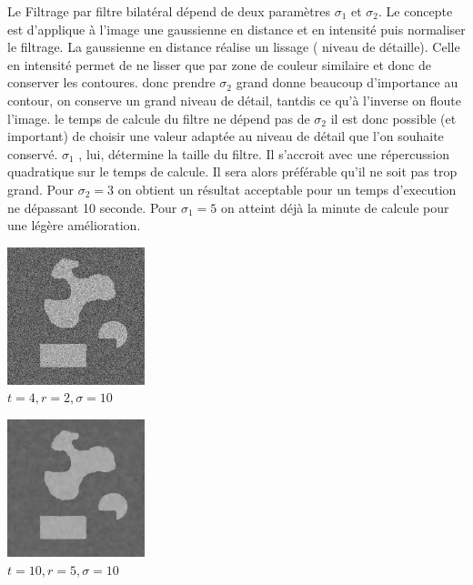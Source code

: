 \documentclass[a4,12pt]{article}
\begin{document}
Le Filtrage par filtre bilatéral dépend de deux paramètres $\sigma_1$ et $\sigma_2$. 
Le concepte est d'applique à l'image une gaussienne en distance et en intensité puis normaliser le filtrage.
La gaussienne en distance réalise un lissage ( niveau de détaille). 
Celle en intensité permet de ne lisser que par zone de couleur similaire et donc de conserver les contoures.
donc prendre $\sigma_2$ grand donne beaucoup d'importance au contour, 
on conserve un grand niveau de détail, 
tantdis ce qu'à l'inverse on floute l'image.
le temps de calcule du filtre ne dépend pas de $\sigma_2$ 
il est donc possible (et important) de choisir une valeur adaptée au niveau de détail que l'on souhaite conservé.
$\sigma_1$ , lui, détermine la taille du filtre. 
Il s'accroit avec une répercussion quadratique sur le temps de calcule.
Il sera alors préférable qu'il ne soit pas trop grand. 
Pour $\sigma_2 = 3 $ on obtient un résultat acceptable pour un temps d'execution ne dépassant 10 seconde.
Pour $\sigma_1 = 5 $ on atteint déjà la minute de calcule pour une légère amélioration.
\\
\noindent
\begin{minipage}[c]{0.33\linewidth}
	\begin{center}
		\includegraphics[width = 40mm]{./img/formOrig.jpg}\\
		\textit{$t=4, r=2, \sigma=10$}\\
	\end{center}
\end{minipage}
\begin{minipage}[c]{0.33\linewidth}
	\begin{center}
		\includegraphics[width = 40mm]{./img/formbb25Bil3_20.jpg}\\
		\textit{$t=10, r=5, \sigma=10$}\\
	\end{center}
\end{minipage}
\end{document}
